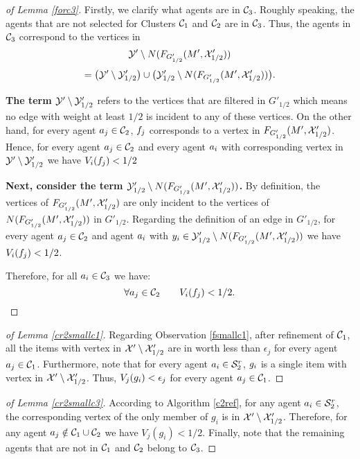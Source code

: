 \begin{proof}[of Lemma \ref{forc3}] 
Firstly, we clarify what agents are in $\mathcal{C}_3$. Roughly speaking, the agents that are not selected for Clusters $\mathcal{C}_1$ and $\mathcal{C}_2$ are in $\mathcal{C}_3$. Thus, the agents in $\mathcal{C}_3$ correspond to the vertices in  
$$\mathcal{Y}' \setminus N(F_{G'_{1/2}}(M',\mathcal{X}'_{1/2}))$$
$$=\big(\mathcal{Y}' \setminus \mathcal{Y}'_{1/2}\big) \cup  \big(\mathcal{Y}'_{1/2} \setminus N(F_{G'_{1/2}}(M',\mathcal{X}'_{1/2}))\big).$$

\textbf{The term $ \mathcal{Y}' \setminus \mathcal{Y}'_{1/2} $ } refers to the vertices that are filtered in $G'_{1/2}$ which means no edge with weight at least $1/2$ is incident to any of these vertices.  
On the other hand, for every agent $a_j \in \mathcal{C}_2$, $f_j$ corresponds to a vertex in $F_{G'_{1/2}}(M',\mathcal{X}'_{1/2})$.  Hence, for every agent $a_j \in \mathcal{C}_2$  and every agent $a_i$ with corresponding vertex in $\mathcal{Y}' \setminus \mathcal{Y}'_{1/2}$ we have $V_i(f_j) <1/2$


\textbf{Next, consider the term $\mathcal{Y}'_{1/2} \setminus N(F_{G'_{1/2}}(M',\mathcal{X}'_{1/2}))$.} By definition, the vertices of $F_{G'_{1/2}}(M',\mathcal{X}'_{1/2})$ are only incident to the vertices of $N(F_{G'_{1/2}}(M',\mathcal{X}'_{1/2}))$ in $G'_{1/2}$. Regarding the definition of an edge in $G'_{1/2}$, for every agent $a_j \in \mathcal{C}_2$ and agent $a_i$ with $y_i \in \mathcal{Y}'_{1/2} \setminus N(F_{G'_{1/2}}(M',\mathcal{X}'_{1/2}))$ we have $V_i(f_j) <1/2$.

Therefore, for all $a_i \in \mathcal{C}_3$ we have: 
 $$\forall a_j \in \mathcal{C}_2 \qquad V_i(f_j) < 1/2.$$
\end{proof}

\begin{proof}[of Lemma \ref{cr2smallc1}]
Regarding Observation \ref{fsmallc1}, after refinement of $\mathcal{C}_1$, all the items with vertex in $\mathcal{X}' \setminus \mathcal{X}'_{1/2}$ are in worth less than $\epsilon_j$ for every agent $a_j \in \mathcal{C}_1$. Furthermore, note that for every agent $a_i \in \mathcal{S}_2^r$, $g_i$ is a single item with vertex in $\mathcal{X}' \setminus \mathcal{X}'_{1/2}$. Thus, $V_j(g_i)< \epsilon_j$ for every agent $a_j \in \mathcal{C}_1$.
\end{proof}

\begin{proof}[of Lemma \ref{cr2smallc3}]
According to Algorithm \ref{c2ref}, for any agent $a_i \in \mathcal{S}_2^r$, the corresponding vertex of the only member of $g_i$ is in $\mathcal{X}' \setminus \mathcal{X}'_{1/2}$. Therefore, for any agent $a_j \notin \mathcal{C}_1 \cup \mathcal{C}_2$ we have $V_j(g_i) < 1/2$. Finally, note that the remaining agents that are not in $\mathcal{C}_1$ and $\mathcal{C}_2$ belong to $\mathcal{C}_3$.
\end{proof}

